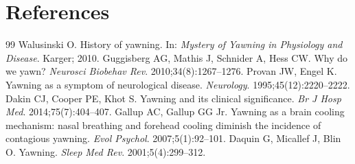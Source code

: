 \section*{References}
\begin{thebibliography}{99}
Walusinski O. History of yawning. In: \textit{Mystery of Yawning in Physiology and Disease}. Karger; 2010.
Guggisberg AG, Mathis J, Schnider A, Hess CW. Why do we yawn? \textit{Neurosci Biobehav Rev}. 2010;34(8):1267--1276.
Provan JW, Engel K. Yawning as a symptom of neurological disease. \textit{Neurology}. 1995;45(12):2220--2222.
Dakin CJ, Cooper PE, Khot S. Yawning and its clinical significance. \textit{Br J Hosp Med}. 2014;75(7):404--407.
Gallup AC, Gallup GG Jr. Yawning as a brain cooling mechanism: nasal breathing and forehead cooling diminish the incidence of contagious yawning. \textit{Evol Psychol}. 2007;5(1):92--101.
Daquin G, Micallef J, Blin O. Yawning. \textit{Sleep Med Rev}. 2001;5(4):299--312.
\end{thebibliography}
